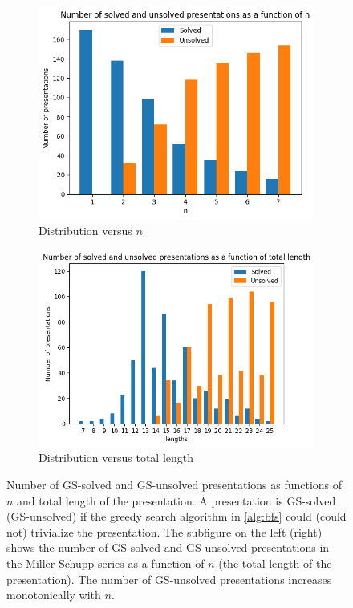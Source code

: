\begin{figure}
	\centering
	\begin{subfigure}[b]{0.5\textwidth}
		\includegraphics[width=\textwidth]{fig/hist_vs_n.png}
		\caption{Distribution versus $n$}
		\label{fig:hist_vs_n}
	\end{subfigure}%
	\begin{subfigure}[b]{0.5\textwidth}
		\centering
		\includegraphics[width=1.1\textwidth]{fig/hist_vs_lengths.png}
		\caption{Distribution versus total length}
		\label{fig:hist_vs_length}
	\end{subfigure}
	\caption{Number of GS-solved and GS-unsolved presentations as functions of $n$ and total length of the presentation. A presentation is GS-solved (GS-unsolved) if the greedy search algorithm in  \autoref{alg:bfs} could (could not) trivialize the presentation. The subfigure on the left (right) shows the number of GS-solved and GS-unsolved presentations in the Miller-Schupp series as a function of $n$ (the total length of the presentation). The number of GS-unsolved presentations increases monotonically with $n$. } \label{fig:miller_schupp_statistics}
\end{figure}